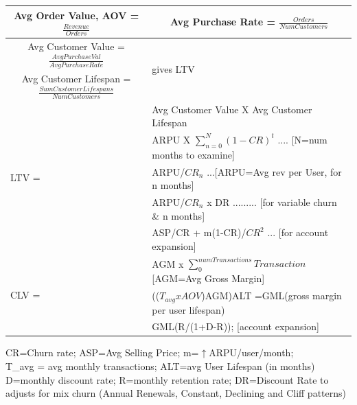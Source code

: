 \documentclass{beamer}
\begin{document}
\begingroup
\small

\begin{frame}

\begin{table}
\begin{tabular}{llll}
\multicolumn{2}{c}{Avg Order Value, AOV = $\frac{Revenue}{Orders}$};
& \multicolumn{2}{c}{Avg Purchase Rate = $\frac{Orders}{NumCustomers}$} 
\\ \hline
\multicolumn{3}{c}{Avg Customer Value = $\frac{Avg Purchase Val}{Avg Purchase Rate}$}
& \multirow{2}{*}{gives LTV}
\\ %
\multicolumn{3}{c}{Avg Customer Lifespan = $\frac{Sum Customer Lifespans}{Num Customers}$}
& \\ \hline
\multirow{5}{*}{LTV = }
& \multicolumn{3}{l}{Avg Customer Value X Avg Customer Lifespan}
\\ 
& \multicolumn{3}{l}{ARPU X $\sum_{n=0}^{N}(1-CR)^t$ .... [N=num months to examine]}
\\
& \multicolumn{3}{l}{ARPU/$CR_n$ ...[ARPU=Avg rev per User, for n months]}
\\
& \multicolumn{3}{l}{ARPU/$CR_n$ x DR ......... [for variable churn \& n months]}
\\
& \multicolumn{3}{l}{ASP/CR + m(1-CR)/$CR^2$ ... [for account expansion]}
\\ \hline
\multirow{3}{*}{CLV = }
& \multicolumn{3}{l}{AGM x $\sum_{0}^{numTransactions} Transaction$ [AGM=Avg Gross Margin]}
\\
& \multicolumn{3}{l}{(($T_{avg}xAOV$)AGM)ALT =GML(gross margin per user lifespan)}
\\
& \multicolumn{3}{l}{GML(R/(1+D-R)); [account expansion]}
\\
\hline
\end{tabular}
\end{table}


CR=Churn rate; ASP=Avg Selling Price; m=$\uparrow$ARPU/user/month;\\
T\_avg = avg monthly transactions; ALT=avg User Lifespan (in months)\\
D=monthly discount rate; R=monthly retention rate; 
DR=Discount Rate to adjusts for mix churn (Annual Renewals, Constant, Declining and Cliff patterns)

\end{frame}

\endgroup
\end{document}

